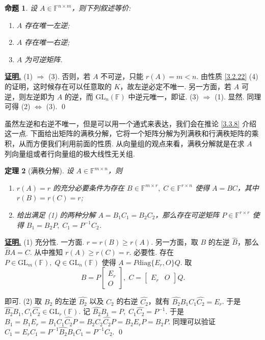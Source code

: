 \documentclass[10pt,openany]{article}
\theoremstyle{thmstyle} %
\newtheorem{theorem}{定理}[subsection]
\theoremstyle{defstyle} %
\theoremstyle{prostyle} %
\newtheorem{proposition}[theorem]{命题}
\theoremstyle{exastyle}
\theoremstyle{remstyle}
\renewenvironment{proof}[1][证明]{\par\underline{\textbf{#1.}} \;\fangsong}{\qed\par}
\newcommand{\F}{\mathbb{F}}
\newcommand{\gfn}{\text{GL}_n(\mathbb{F})}
\newcommand{\gfm}{\text{GL}_m(\mathbb{F})}
\newcommand{\mn}{^{m \times n}}
\newcommand{\nm}{^{n \times m}}
\newcommand{\diag}{\mathrm{diag}}
\begin{document}
\begin{proposition}
	设 \( A \in \F\nm \)，则下列叙述等价: 
	\begin{enumerate}[(1)]
		\item \( A \) 存在唯一左逆;
		\item \( A \) 存在唯一右逆;
		\item \( A \) 为可逆矩阵.
	\end{enumerate}
\end{proposition}

\begin{proof}
	(1) \( \Rightarrow \) (3). 否则，若 \( A \) 不可逆，只能 \( r(A)=m<n \). 由性质 \ref{3.2.22} (4) 的证明，这时候存在可以任意取的 \( K \)，故左逆必定不唯一. 另一方面，若 \( A \) 可逆，则左逆即为 \( A \) 的逆，而 \( \gfn \) 中逆元唯一，即证. (3) \( \Rightarrow \) (1). 显然. 同理可得 (2) \( \Leftrightarrow \) (3).
\end{proof}

虽然左逆和右逆不唯一，但是可以用一个通式来表达，我们会在推论 \ref{3.3.8} 介绍这一点. 下面给出矩阵的满秩分解，它将一个矩阵分解为列满秩和行满秩矩阵的乘积，从而方便我们利用前面的性质. 从向量组的观点来看，满秩分解就是在求 \( A \) 列向量组或者行向量组的极大线性无关组.

\begin{theorem}[满秩分解] \label{3.2.26}
	设 \( A \in \F\mn \)，则
	\begin{enumerate}[(1)]
		\item \( r(A)=r \) 的充分必要条件为存在 \( B \in \F^{m \times r}, \; C \in \F^{r \times n} \) 使得 \( A=BC \)，其中 \( r(B)=r(C)=r \);
		\item 给出满足 (1) 的两种分解 \( A=B_1C_1=B_2C_2 \)，那么存在可逆矩阵 \( P \in \F^{r \times r} \) 使得 \( B_1=B_2P, \; C_1=P^{-1}C_2 \).
	\end{enumerate}
\end{theorem}

\begin{proof}
	(1) 充分性. 一方面. \( r= r(B) \geq r(A) \). 另一方面，取 \( B \) 的左逆 \( \hat{B} \)，那么 \( \hat{B}A=C \). 从中推知 \( r(A) \geq r(C)=r \). 必要性. 存在 \( P \in \gfm, \; Q \in \gfn \) 使得 \( A=P\diag\{E_r,O\}Q \). 取
	\[ B=P\begin{bmatrix}
		E_r \\ O
	\end{bmatrix}, \; C=\begin{bmatrix}
	E_r & O 
	\end{bmatrix}Q. \]
	
	即可. (2) 取 \( B_2 \) 的左逆 \( \hat{B_2} \) 以及 \( C_2 \) 的右逆 \( \hat{C_2} \)，就有 \( \hat{B_2}B_1C_1\hat{C_2}=E_r \). 于是 \( \hat{B_2}B_1, C_1\hat{C_2} \in \text{GL}_r(\F) \). 记 \( \hat{B_2}B_1=P, \; C_1\hat{C_2}=P^{-1} \). 于是 \( B_1=B_1E_r=B_1C_1\hat{C_2}P=B_2C_2\hat{C_2}P=B_2E_rP=B_2P \). 同理可以验证 \( C_1=E_rC_1=P^{-1}\hat{B_2}B_1C_1=P^{-1}C_2 \).
\end{proof}
\end{document}
